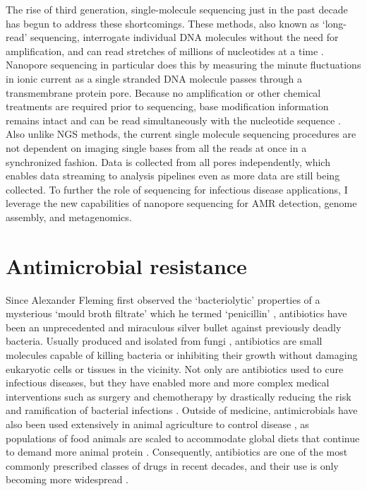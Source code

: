 The rise of third generation, single-molecule sequencing just in the past decade has begun to address these shortcomings. These methods, also known as ‘long-read’ sequencing, interrogate individual DNA molecules without the need for amplification, and can read stretches of millions of nucleotides at a time \citep{Jain2018-qp}. Nanopore sequencing in particular does this by measuring the minute fluctuations in ionic current as a single stranded DNA molecule passes through a transmembrane protein pore. Because no amplification or other chemical treatments are required prior to sequencing, base modification information remains intact and can be read simultaneously with the nucleotide sequence \citep{Simpson2017-wb, McIntyre2017-ed}. Also unlike NGS methods, the current single molecule sequencing procedures are not dependent on imaging single bases from all the reads at once in a synchronized fashion. Data is collected from all pores independently, which enables data streaming to analysis pipelines even as more data are still being collected. To further the role of sequencing for infectious disease applications, I leverage the new capabilities of nanopore sequencing for AMR detection, genome assembly, and metagenomics.

\section{Antimicrobial resistance}
\label{sec:amr}
Since Alexander Fleming first observed the ‘bacteriolytic’ properties of a mysterious ‘mould broth filtrate’ which he termed ‘penicillin’ \citep{Fleming1929-cb}, antibiotics have been an unprecedented and miraculous silver bullet against previously deadly bacteria. Usually produced and isolated from fungi \citep{Martinez2008-cf}, antibiotics are small molecules capable of killing bacteria or inhibiting their growth without damaging eukaryotic cells or tissues in the vicinity. Not only are antibiotics used to cure infectious diseases, but they have enabled more and more complex medical interventions such as surgery and chemotherapy by drastically reducing the risk and ramification of bacterial infections \citep{Crofts2017-ni}. Outside of medicine, antimicrobials have also been used extensively in animal agriculture to control disease \citep{Aarestrup2015-zu}, as populations of food animals are scaled to accommodate global diets that continue to demand more animal protein \citep{Van_Boeckel2019-zl}. Consequently, antibiotics are one of the most commonly prescribed classes of drugs in recent decades, and their use is only becoming more widespread \citep{Van_Boeckel2014-io}.

